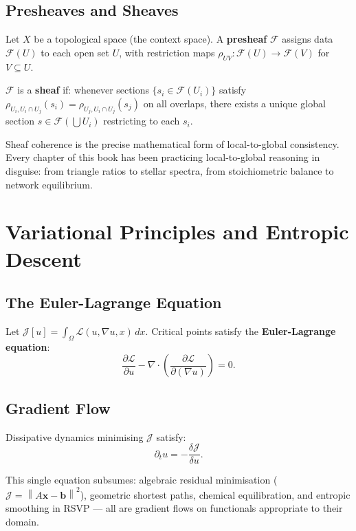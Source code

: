 \documentclass[11pt, openany]{book}
\theoremstyle{plain}
\theoremstyle{definition}
\theoremstyle{remark}
\newcommand{\norm}[1]{\left\lVert#1\right\rVert}
\newcommand{\pd}[2]{\frac{\partial #1}{\partial #2}}
\begin{document}
\section{Presheaves and Sheaves}

Let $X$ be a topological space (the context space). A \textbf{presheaf}
$\mathcal{F}$ assigns data $\mathcal{F}(U)$ to each open set $U$, with
restriction maps $\rho_{UV}:\mathcal{F}(U)\to\mathcal{F}(V)$ for $V\subseteq U$.

$\mathcal{F}$ is a \textbf{sheaf} if: whenever sections
$\{s_i\in\mathcal{F}(U_i)\}$ satisfy $\rho_{U_i,U_i\cap U_j}(s_i)=\rho_{U_j,U_i\cap U_j}(s_j)$
on all overlaps, there exists a unique global section $s\in\mathcal{F}(\bigcup U_i)$
restricting to each $s_i$.

\begin{principle}
Sheaf coherence is the precise mathematical form of local-to-global
consistency. Every chapter of this book has been practicing local-to-global
reasoning in disguise: from triangle ratios to stellar spectra, from
stoichiometric balance to network equilibrium.
\end{principle}

\chapter{Variational Principles and Entropic Descent}

\section{The Euler-Lagrange Equation}

Let $\mathcal{J}[u]=\int_\Omega\mathcal{L}(u,\nabla u,x)\,dx$. Critical
points satisfy the \textbf{Euler-Lagrange equation}:
\[
  \pd{\mathcal{L}}{u}-\nabla\cdot\left(\pd{\mathcal{L}}{(\nabla u)}\right)=0.
\]

\section{Gradient Flow}

Dissipative dynamics minimising $\mathcal{J}$ satisfy:
\[
  \partial_t u = -\frac{\delta\mathcal{J}}{\delta u}.
\]

This single equation subsumes: algebraic residual minimisation
($\mathcal{J}=\norm{A\mathbf{x}-\mathbf{b}}^2$), geometric shortest paths,
chemical equilibration, and entropic smoothing in RSVP --- all are gradient
flows on functionals appropriate to their domain.
\end{document}

